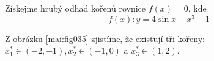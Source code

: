 \begin{mdframed}[style=mdexam]
  \begin{example}\label{mai:exam100}
    Získejme hrubý odhad kořenů rovnice \(f(x) = 0\), kde 
    \begin{equation*}
      f(x):y=4\sin x - x^3 -  1
    \end{equation*}  

    {\centering
      \captionsetup{type=figure}
      \label{mai:fig035}
    \par}
    Z obrázku \ref{mai:fig035} zjistíme, že existují tři kořeny: $x_1^*\in(-2,-1),
    x_2^*\in(-1, 0)$ a $x_3^*\in(1, 2)$.

  \end{example}
\end{mdframed}